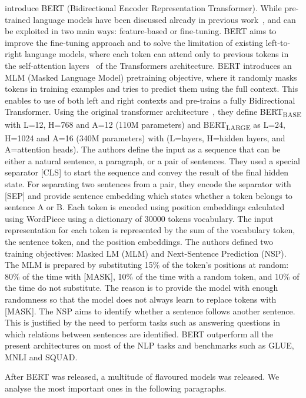 \cite{devlin2018bert} introduce BERT (Bidirectional Encoder Representation Transformer). 
While pre-trained language models have been discussed already in previous work~\cite{radford2018improving}, and can be exploited in two main ways: feature-based or fine-tuning. 
BERT aims to improve the fine-tuning approach and to solve the limitation of existing left-to-right language models, where each token can attend only to previous tokens in the self-attention layers~\cite{vaswani2017attention} of the Transformers architecture. 
BERT introduces an MLM (Masked Language Model) pretraining objective, where it randomly masks tokens in training examples and tries to predict them using the full context. This enables to use of both left and right contexts and pre-trains a fully Bidirectional Transformer.
Using the original transformer architecture~\cite{vaswani2017attention}, they define BERT\textsubscript{BASE} with L=12, H=768 and A=12 (110M parameters) and BERT\textsubscript{LARGE} as L=24, H=1024 and A=16 (340M parameters) with (L=layers, H=hidden layers, and A=attention heads).
The authors define the input as a sequence that can be either a natural sentence, a paragraph, or a pair of sentences. They used a special separator [CLS] to start the sequence and convey the result of the final hidden state. For separating two sentences from a pair, they encode the separator with [SEP] and provide sentence embedding which states whether a token belongs to sentence A or B. 
Each token is encoded using position embeddings calculated using WordPiece using a dictionary of 30000 tokens vocabulary. 
The input representation for each token is represented by the sum of the vocabulary token, the sentence token, and the position embeddings. 
The authors defined two training objectives: Masked LM (MLM) and Next-Sentence Prediction (NSP). 
The MLM is prepared by substituting 15\% of the token's positions at random: 80\% of the time with [MASK], 10\% of the time with a random token, and 10\% of the time do not substitute. The reason is to provide the model with enough randomness so that the model does not always learn to replace tokens with [MASK]. 
The NSP aims to identify whether a sentence follows another sentence. This is justified by the need to perform tasks such as answering questions in which relations between sentences are identified. 
BERT outperform all the present architectures on most of the NLP tasks and benchmarks such as GLUE, MNLI and SQUAD. 

After BERT was released, a multitude of flavoured models was released. We analyse the most important ones in the following paragraphs. 

